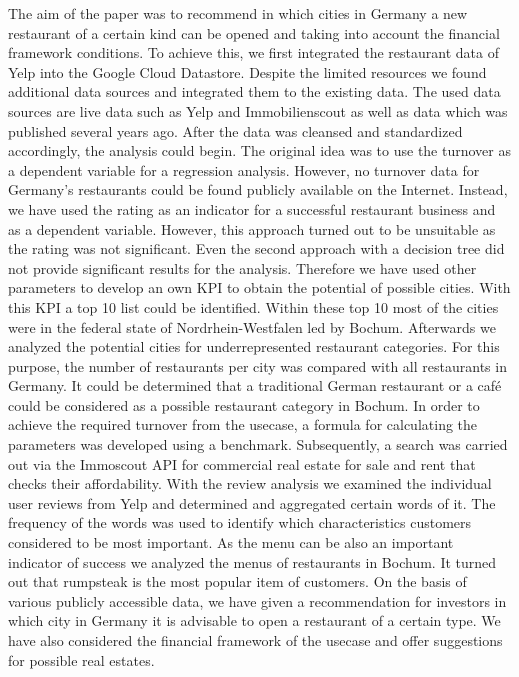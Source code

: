 The aim of the paper was to recommend in which cities in Germany a new restaurant of a certain kind can be opened and taking into account the financial framework conditions. To achieve this, we first integrated the restaurant data of Yelp into the Google Cloud Datastore. Despite the limited resources we found additional data sources and integrated them to the existing data. The used data sources are live data such as Yelp and Immobilienscout as well as data which was published several years ago. After the data was cleansed and standardized accordingly, the analysis could begin. The original idea was to use the turnover as a dependent variable for a regression analysis. However, no turnover data for Germany's restaurants could be found publicly available on the Internet. Instead, we have used the rating as an indicator for a successful restaurant business and as a dependent variable. However, this approach turned out to be unsuitable as the rating was not significant. Even the second approach with a decision tree did not provide significant results for the analysis. Therefore we have used other parameters to develop an own KPI to obtain the potential of possible cities. With this KPI a top 10 list could be identified. Within these top 10 most of the cities were in the federal state of Nordrhein-Westfalen led by Bochum. Afterwards we analyzed the potential cities for underrepresented restaurant categories. For this purpose, the number of restaurants per city was compared with all restaurants in Germany. It could be determined that a traditional German restaurant or a café could be considered as a possible restaurant category in Bochum.
In order to achieve the required turnover from the usecase, a formula for calculating the parameters was developed using a benchmark. Subsequently, a search was carried out via the Immoscout API for commercial real estate for sale and rent that checks their affordability. %
With the review analysis we examined the individual user reviews from Yelp and determined and aggregated certain words of it. The frequency of the words was used to identify which characteristics customers considered to be most important. %
\newline
As the menu can be also an important indicator of success we analyzed the menus of restaurants in Bochum. It turned out that rumpsteak is the most popular item of customers.
On the basis of various publicly accessible data, we have given a recommendation for investors in which city in Germany it is advisable to open a restaurant of a certain type. We have also considered the financial framework of the usecase and offer suggestions for possible real estates.
